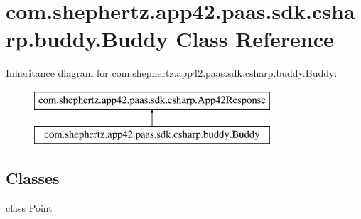 \hypertarget{classcom_1_1shephertz_1_1app42_1_1paas_1_1sdk_1_1csharp_1_1buddy_1_1_buddy}{\section{com.\+shephertz.\+app42.\+paas.\+sdk.\+csharp.\+buddy.\+Buddy Class Reference}
\label{classcom_1_1shephertz_1_1app42_1_1paas_1_1sdk_1_1csharp_1_1buddy_1_1_buddy}
}
Inheritance diagram for com.\+shephertz.\+app42.\+paas.\+sdk.\+csharp.\+buddy.\+Buddy\+:\begin{figure}[H]
\begin{center}
\leavevmode
\includegraphics[height=2.000000cm]{classcom_1_1shephertz_1_1app42_1_1paas_1_1sdk_1_1csharp_1_1buddy_1_1_buddy}
\end{center}
\end{figure}
\subsection*{Classes}
\begin{DoxyCompactItemize}
\item 
class \hyperlink{classcom_1_1shephertz_1_1app42_1_1paas_1_1sdk_1_1csharp_1_1buddy_1_1_buddy_1_1_point}{Point}
\end{DoxyCompactItemize}
